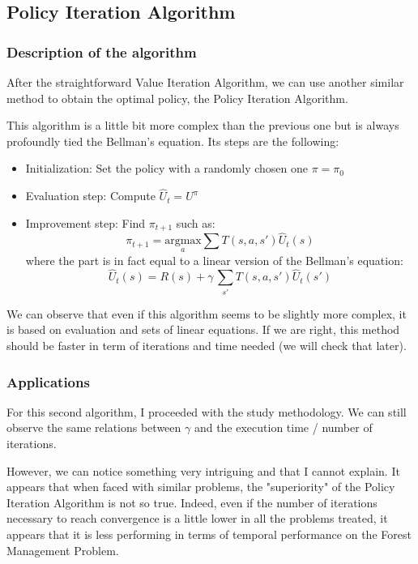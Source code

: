 \documentclass[11pt]{article}
\begin{document}
\begin{multicols}{2}
\subsection{Policy Iteration Algorithm}

\subsubsection{Description of the algorithm}
After the straightforward Value Iteration Algorithm, we can use another similar method to obtain the optimal policy, the Policy Iteration Algorithm.

This algorithm is a little bit more complex than the previous one but is always profoundly tied the Bellman's equation. Its steps are the following:
\begin{itemize}
\item Initialization: Set the policy with a randomly chosen one $\pi = \pi_0$
\item Evaluation step: Compute $\hat{U}_t = U^\pi$
\item Improvement step: Find $\pi_{t+1}$ such as:
$$\pi_{t+1} = \underset{a}{\text{argmax}} \sum T(s, a, s') \hat{U}_t(s)$$
where the part is in fact equal to a linear version of the Bellman's equation:
$$\hat{U}_{t}(s) = R(s) + \gamma\,  \sum_{s'} T(s, a, s')\hat{U}_t(s')$$
\end{itemize}
We can observe that even if this algorithm seems to be slightly more complex, it is based on evaluation and sets of linear equations. If we are right, this method should be faster in term of iterations and time needed (we will check that later).

\subsubsection{Applications}

For this second algorithm, I proceeded with the study methodology. We can still observe the same relations between $\gamma$ and the execution time / number of iterations.

However, we can notice something very intriguing and that I cannot explain. It appears that when faced with similar problems, the "superiority" of the Policy Iteration Algorithm is not so true. Indeed, even if the number of iterations necessary to reach convergence is a little lower in all the problems treated, it appears that it is less performing in terms of temporal performance on the Forest Management Problem.


\end{multicols}
\end{document}
